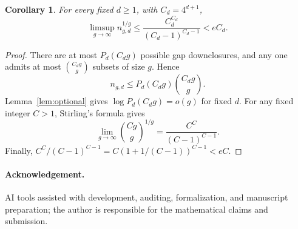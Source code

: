 \documentclass[11pt]{article}
\newtheorem{corollary}[theorem]{Corollary}
\theoremstyle{remark}
\begin{document}
\begin{corollary}\label{cor:optional}
For every fixed $d\ge1$, with $C_d=4^{d+1}$,
\begin{equation}\label{eq:growth}
 \limsup_{g\to\infty}n_{g,d}^{1/g}
 \le\frac{C_d^{C_d}}{(C_d-1)^{C_d-1}}<eC_d.
\end{equation}
\end{corollary}
\begin{proof}
There are at most $P_d(C_dg)$ possible gap downclosures, and any one
admits at most $\binom{C_dg}{g}$ subsets of size $g$. Hence
\[
 n_{g,d}\le P_d(C_dg)\binom{C_dg}{g}.
\]
Lemma~\ref{lem:optional} gives $\log P_d(C_dg)=o(g)$ for fixed $d$.
For any fixed integer $C>1$, Stirling's formula gives
\[
 \lim_{g\to\infty}\binom{Cg}{g}^{1/g}
 =\frac{C^C}{(C-1)^{C-1}}.
\]
Finally, $C^C/(C-1)^{C-1}=C(1+1/(C-1))^{C-1}<eC$.
\end{proof}

\paragraph{Acknowledgement.}
AI tools assisted with development, auditing, formalization, and manuscript
preparation; the author is responsible for the mathematical claims and submission.
\end{document}
